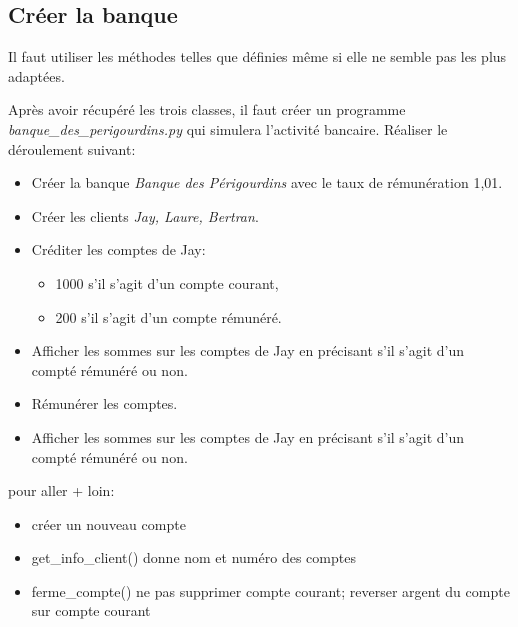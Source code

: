 \documentclass[a4paper,11pt]{article}
\begin{document}
\begin{Form}
\section{Créer la banque}
\begin{commentprof}
Il faut utiliser les méthodes telles que définies même si elle ne semble pas les plus adaptées.
\end{commentprof}
Après avoir récupéré les trois classes, il faut créer un programme \emph{banque\_des\_perigourdins.py} qui simulera l'activité bancaire. Réaliser le déroulement suivant:
\begin{itemize}
\item Créer la banque \emph{Banque des Périgourdins} avec le taux de rémunération 1,01.
\item Créer les clients \emph{Jay, Laure, Bertran}.
\item Créditer les comptes de Jay:
\begin{itemize}
\item 1000 s'il s'agit d'un compte courant,
\item 200 s'il s'agit d'un compte rémunéré.
\end{itemize}
\item Afficher les sommes sur les comptes de Jay en précisant s'il s'agit d'un compté rémunéré ou non.
\item Rémunérer les comptes.
\item Afficher les sommes sur les comptes de Jay en précisant s'il s'agit d'un compté rémunéré ou non.
\end{itemize}
\begin{commentprof}
pour aller + loin:
\begin{itemize}
\item créer un nouveau compte
\item get\_info\_client() donne nom et numéro des comptes
\item ferme\_compte() ne pas supprimer compte courant; reverser argent du compte sur compte courant
\end{itemize}
\end{commentprof}
\end{Form}
\end{document}
